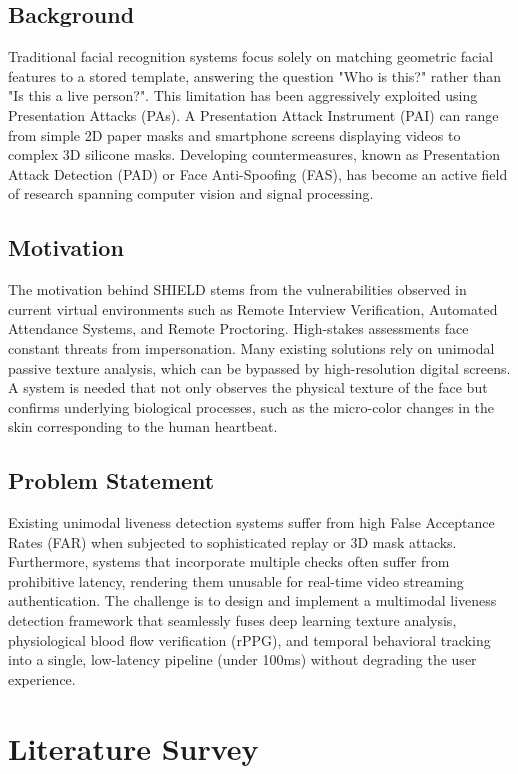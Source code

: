 \documentclass[12pt, a4paper]{report}
\begin{document}
\section{Background}
Traditional facial recognition systems focus solely on matching geometric facial features to a stored template, answering the question "Who is this?" rather than "Is this a live person?". This limitation has been aggressively exploited using Presentation Attacks (PAs). A Presentation Attack Instrument (PAI) can range from simple 2D paper masks and smartphone screens displaying videos to complex 3D silicone masks. Developing countermeasures, known as Presentation Attack Detection (PAD) or Face Anti-Spoofing (FAS), has become an active field of research spanning computer vision and signal processing.

\section{Motivation}
The motivation behind SHIELD stems from the vulnerabilities observed in current virtual environments such as Remote Interview Verification, Automated Attendance Systems, and Remote Proctoring. High-stakes assessments face constant threats from impersonation. Many existing solutions rely on unimodal passive texture analysis, which can be bypassed by high-resolution digital screens. A system is needed that not only observes the physical texture of the face but confirms underlying biological processes, such as the micro-color changes in the skin corresponding to the human heartbeat.

\section{Problem Statement}
Existing unimodal liveness detection systems suffer from high False Acceptance Rates (FAR) when subjected to sophisticated replay or 3D mask attacks. Furthermore, systems that incorporate multiple checks often suffer from prohibitive latency, rendering them unusable for real-time video streaming authentication. The challenge is to design and implement a multimodal liveness detection framework that seamlessly fuses deep learning texture analysis, physiological blood flow verification (rPPG), and temporal behavioral tracking into a single, low-latency pipeline (under 100ms) without degrading the user experience.

\chapter{Literature Survey}
\end{document}
